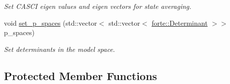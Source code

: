 \begin{DoxyCompactItemize}
\begin{DoxyCompactList}\small\item\em Set C\+A\+S\+CI eigen values and eigen vectors for state averaging. \end{DoxyCompactList}\item 
void \mbox{\hyperlink{classforte_1_1_d_s_r_g___m_r_p_t3_af5b78a8ae153c66e5733d0749972185b}{set\+\_\+p\+\_\+spaces}} (std\+::vector$<$ std\+::vector$<$ \mbox{\hyperlink{namespaceforte_a2076c63fd7b8732004d9e1442ce527c1}{forte\+::\+Determinant}} $>$$>$ p\+\_\+spaces)
\begin{DoxyCompactList}\small\item\em Set determinants in the model space. \end{DoxyCompactList}\end{DoxyCompactItemize}
\subsection*{Protected Member Functions}
